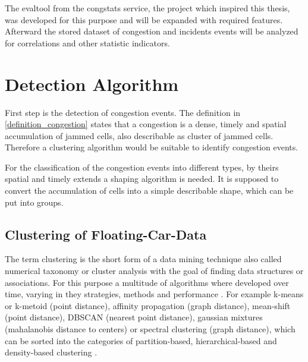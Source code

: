 \documentclass[a4paper,headsepline,footsepline,fontsize=11pt,BCOR=12mm,DIV=12]{report}
\begin{document}
The \gls{evaltool} from the \gls{congstats} service, the project which inspired this thesis, was developed for this purpose and will be expanded with required features. Afterward the stored dataset of congestion and incidents events will be analyzed for correlations and other statistic indicators.

\bigskip

\section{Detection Algorithm}
First step is the detection of congestion events. The definition in \ref{definition_congestion} states that a congestion is a dense, timely and spatial accumulation of jammed cells, also describable as cluster of jammed cells. Therefore a clustering algorithm would be suitable to identify congestion events.

For the classification of the congestion events into different types, by theirs spatial and timely extends a shaping algorithm is needed. It is supposed to convert the accumulation of cells into a simple describable shape, which can be put into groups.

\subsection{Clustering of Floating-Car-Data}
\label{methodology_clustering}
The term clustering is the short form of a data mining technique also called numerical taxonomy or cluster analysis with the goal of finding data structures or associations. For this purpose a multitude of algorithms where developed over time, varying in they strategies, methods and performance \cite{Busch2004}. For example k-means or k-metoid (point distance), affinity propagation (graph distance), mean-shift (point distance), DBSCAN (nearest point distance), gaussian mixtures (mahalanobis distance to centers) or spectral clustering (graph distance), which can be sorted into the categories of partition-based, hierarchical-based and density-based clustering \cite{Chauhan2020,Yildirim2020}.
\end{document}
